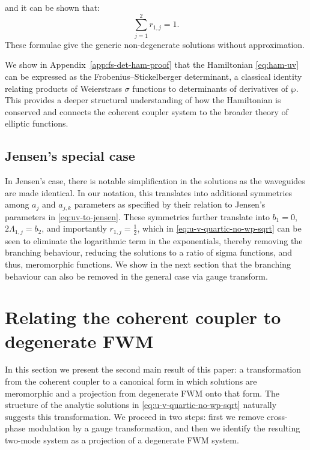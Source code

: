 \documentclass[11pt,a4paper]{article}
\numberwithin{equation}{section}
\begin{document}
and it can be shown that:
\begin{equation}
  \sum_{j=1}^{2}r_{1,j} = 1. \label{eq:r1j-sum}
\end{equation}
These formulae give the generic non-degenerate solutions without approximation.

We show in Appendix~\ref{app:fs-det-ham-proof} that the Hamiltonian \eqref{eq:ham-uv} can be expressed as the Frobenius--Stickelberger determinant, a classical identity relating products of Weierstrass $\sigma$ functions to determinants of derivatives of $\wp$.
This provides a deeper structural understanding of how the Hamiltonian is conserved and connects the coherent coupler system to the broader theory of elliptic functions.

\subsection{Jensen's special case}

In Jensen's case, there is notable simplification in the solutions as the waveguides are made identical.
In our notation, this translates into additional symmetries among $a_j$ and $a_{j,k}$ parameters as specified by their relation to Jensen's parameters in \eqref{eq:uv-to-jensen}.
These symmetries further translate into $b_1=0$, $2\Lambda_{1,j}=b_2$, and importantly $r_{1,j} = \frac{1}{2}$, which in \eqref{eq:u-v-quartic-no-wp-sqrt} can be seen to eliminate the logarithmic term in the exponentials, thereby removing the branching behaviour, reducing the solutions to a ratio of sigma functions, and thus, meromorphic functions.
We show in the next section that the branching behaviour can also be removed in the general case via gauge transform.


\section{Relating the coherent coupler to degenerate FWM} \label{sec:coord-transforms}

In this section we present the second main result of this paper: a transformation from the coherent coupler to a canonical form in which solutions are meromorphic and a projection from degenerate FWM onto that form.
The structure of the analytic solutions in \eqref{eq:u-v-quartic-no-wp-sqrt} naturally suggests this transformation.
We proceed in two steps: first we remove cross-phase modulation by a gauge transformation, and then we identify the resulting two-mode system as a projection of a degenerate FWM system.
\end{document}

